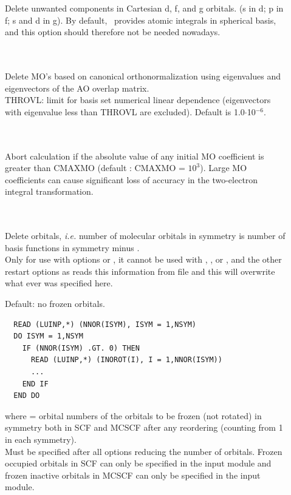 \begin{description}
\item[]
  Delete unwanted components in Cartesian d, f, and g orbitals.
  (s in d; p in f; s and d in g). By default, \her\ provides atomic
  integrals in spherical basis, and this option should therefore not
  be needed nowadays.

\item[] \ \\
   \\
  Delete MO's based on canonical orthonormalization using eigenvalues
  and eigenvectors of the AO overlap matrix. \\
  THROVL: limit for basis
  set numerical linear dependence (eigenvectors with eigenvalue less
  than THROVL are excluded). Default is 1.0$\cdot$10$^{-6}$.

\item[] \ \\
   \\
  Abort calculation if the absolute value of any initial MO coefficient is
  greater than CMAXMO (default : CMAXMO = $10^3$).  Large MO coefficients
  can cause significant loss of accuracy in the two-electron integral
  transformation.

\item[] \ \\
   \\
  Delete orbitals, {\it i.e.\/} number of molecular orbitals
  in symmetry  is number of basis functions in symmetry  minus
  . \\
  Only for use with  options  or , 
  it cannot be used with , , or ,
  and the other restart options as  reads this information from file
  and this will overwrite what ever was specified here.

\item[]
  Default: no frozen orbitals.
\begin{verbatim}
  READ (LUINP,*) (NNOR(ISYM), ISYM = 1,NSYM)
  DO ISYM = 1,NSYM
    IF (NNOR(ISYM) .GT. 0) THEN
      READ (LUINP,*) (INOROT(I), I = 1,NNOR(ISYM))
      ...
    END IF
  END DO
\end{verbatim}
  where  = orbital numbers of the orbitals to be
          frozen (not rotated)
          in symmetry  both in SCF and MCSCF
          after any reordering (counting from 1 in each symmetry).\\
  Must be specified after all options reducing the number of orbitals.
  Frozen occupied orbitals in SCF can only be specified in the  input module
  and frozen inactive orbitals in MCSCF can only be specified in the 
  input module.


\end{description}
